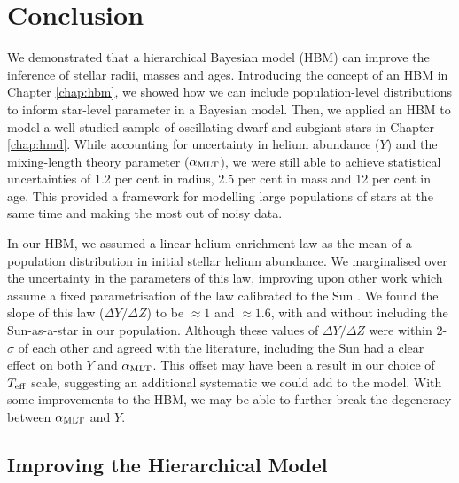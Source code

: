 %
%
%
%
%
\chapter{Conclusion}

We demonstrated that a hierarchical Bayesian model (HBM) can improve the inference of stellar radii, masses and ages. Introducing the concept of an HBM in Chapter \ref{chap:hbm}, we showed how we can include population-level distributions to inform star-level parameter in a Bayesian model. Then, we applied an HBM to model a well-studied sample of oscillating dwarf and subgiant stars in Chapter \ref{chap:hmd}. While accounting for uncertainty in helium abundance (\(Y\)) and the mixing-length theory parameter (\({\alpha_\mathrm{MLT}}\)), we were still able to achieve statistical uncertainties of 1.2 per cent in radius, 2.5 per cent in mass and 12 per cent in age. This provided a framework for modelling large populations of stars at the same time and making the most out of noisy data.

In our HBM, we assumed a linear helium enrichment law as the mean of a population distribution in initial stellar helium abundance. We marginalised over the uncertainty in the parameters of this law, improving upon other work which assume a fixed parametrisation of the law calibrated to the Sun \citep[e.g.][]{Serenelli.Johnson.ea2017}. We found the slope of this law (\(\Delta Y/\Delta Z\)) to be \(\approx 1\) and \(\approx 1.6\), with and without including the Sun-as-a-star in our population. Although these values of \(\Delta Y/\Delta Z\) were within 2-\(\sigma\) of each other and agreed with the literature, including the Sun had a clear effect on both \(Y\) and \({\alpha_\mathrm{MLT}}\). This offset may have been a result in our choice of \({T_\mathrm{eff}}\) scale, suggesting an additional systematic we could add to the model. With some improvements to the HBM, we may be able to further break the degeneracy between \({\alpha_\mathrm{MLT}}\) and \(Y\).

\section{Improving the Hierarchical Model}

